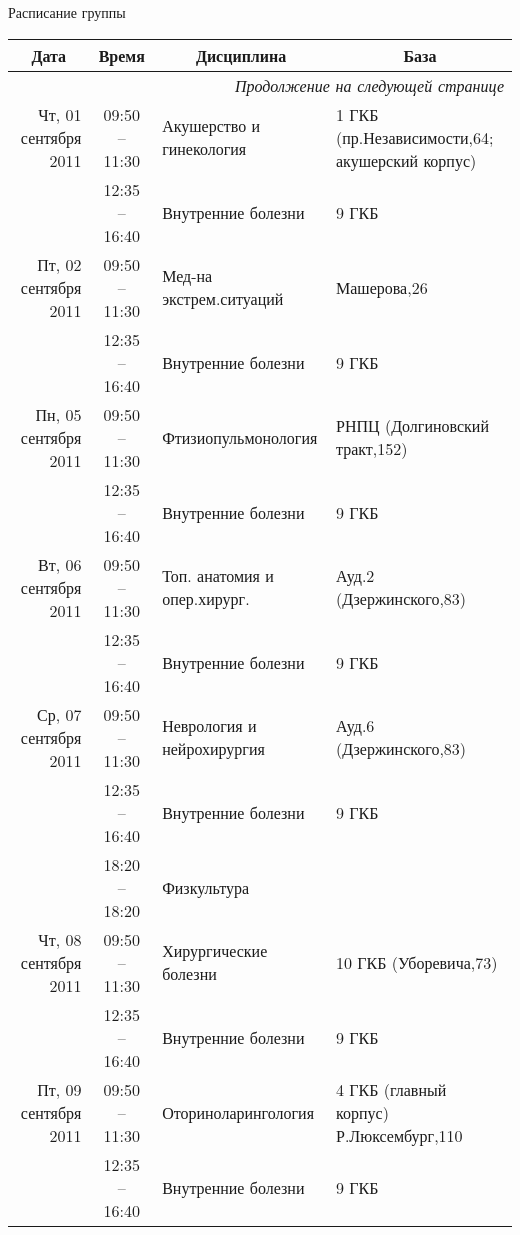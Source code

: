 \documentclass[a4paper,10pt,notitlepage]{report}
\begin{document}
\begin{center}

{\Large Расписание группы }
{\footnotesize
\begin{longtable}{r|c|l|l|}

\hline \multicolumn{1}{|c|}{\textbf{Дата}} &
\multicolumn{1}{c|}{\textbf{Время}} &
\multicolumn{1}{c|}{\textbf{Дисциплина}} &
\multicolumn{1}{c|}{\textbf{База}} \\
\hline
\hline
\endhead

\multicolumn{4}{r|}{{\slshape Продолжение на следующей странице}} \\
\endfoot

\hline
\endlastfoot

\hline Чт, 01 сентября 2011
  & 09:50 -- 11:30 & Акушерство и гинекология & 1 ГКБ (пр.Независимости,64; акушерский корпус) \\ \cline{2-4}
  & 12:35 -- 16:40 & Внутренние болезни & 9 ГКБ \\ \cline{2-4}
\hline Пт, 02 сентября 2011
  & 09:50 -- 11:30 & Мед-на экстрем.ситуаций & Машерова,26 \\ \cline{2-4}
  & 12:35 -- 16:40 & Внутренние болезни & 9 ГКБ \\ \cline{2-4}
\hline Пн, 05 сентября 2011
  & 09:50 -- 11:30 & Фтизиопульмонология & РНПЦ (Долгиновский тракт,152) \\ \cline{2-4}
  & 12:35 -- 16:40 & Внутренние болезни & 9 ГКБ \\ \cline{2-4}
\hline Вт, 06 сентября 2011
  & 09:50 -- 11:30 & Топ. анатомия и опер.хирург. & Ауд.2 (Дзержинского,83) \\ \cline{2-4}
  & 12:35 -- 16:40 & Внутренние болезни & 9 ГКБ \\ \cline{2-4}
\hline Ср, 07 сентября 2011
  & 09:50 -- 11:30 & Неврология и нейрохирургия & Ауд.6 (Дзержинского,83) \\ \cline{2-4}
  & 12:35 -- 16:40 & Внутренние болезни & 9 ГКБ \\ \cline{2-4}
  & 18:20 -- 18:20 & Физкультура &  \\ \cline{2-4}
\hline Чт, 08 сентября 2011
  & 09:50 -- 11:30 & Хирургические болезни & 10 ГКБ (Уборевича,73) \\ \cline{2-4}
  & 12:35 -- 16:40 & Внутренние болезни & 9 ГКБ \\ \cline{2-4}
\hline Пт, 09 сентября 2011
  & 09:50 -- 11:30 & Оториноларингология & 4 ГКБ (главный корпус) Р.Люксембург,110 \\ \cline{2-4}
  & 12:35 -- 16:40 & Внутренние болезни & 9 ГКБ \\ \cline{2-4}

\end{longtable}}
\end{center}
\end{document}
